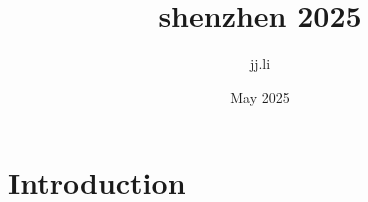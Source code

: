 \documentclass{article}
\title{shenzhen 2025}
\author{jj.li }
\date{May 2025}
\begin{document}
\maketitle

\section{Introduction}
\end{document}
